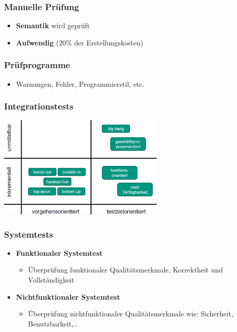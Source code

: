 		\subsubsection{Manuelle Prüfung}
			
			\begin{itemize}
				\item \textbf{Semantik} wird geprüft
				\item \textbf{Aufwendig} (20\% der Erstellungskosten)
			\end{itemize}
	
		\subsubsection{Prüfprogramme}
				
			\begin{itemize}
				\item Warnungen, Fehler, Programmierstil, etc.
			\end{itemize}
	
		\subsubsection{Integrationstests}
			
			\begin{center}
				\includegraphics[width=0.6\textwidth]{../resources/images/integrationstests.png}
			\end{center}
		
		\subsubsection{Systemtests}
				
			\begin{itemize}
				\item \textbf{Funktionaler Systemtest}
				\begin{itemize}
					\item Überprüfung funktionaler Qualitätsmerkmale, Korrektheit und Vollständigkeit
				\end{itemize}
				\item \textbf{Nichtfunktionaler Systemtest}
				\begin{itemize}
					\item Überprüfung nichtfunktionaler Qualitätsmerkmale wie: Sicherheit, Benutzbarkeit,..
				\end{itemize}
			\end{itemize}
		
